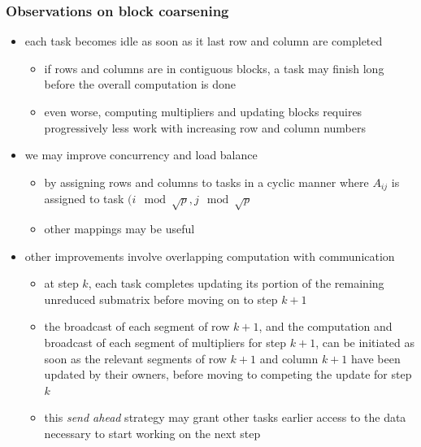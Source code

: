 \begin{frame}[fragile]
%
  \frametitle{Observations on block coarsening}
%
  \begin{itemize}
%
  \item each task becomes idle as soon as it last row and column are completed
    \begin{itemize}
    \item if rows and columns are in contiguous blocks, a task may finish long before the
      overall computation is done
    \item even worse, computing multipliers and updating blocks requires progressively less
      work with increasing row and column numbers
    \end{itemize}
%
  \item we may improve concurrency and load balance 
    \begin{itemize}
    \item by assigning rows and columns to tasks in a cyclic manner where $A_{ij}$ is assigned
      to task $(i \mod \sqrt{p}, j \mod \sqrt{p}$
    \item other mappings may be useful
    \end{itemize}
%
  \item other improvements involve overlapping computation with communication
    \begin{itemize}
    \item at step $k$, each task completes updating its portion of the remaining unreduced
      submatrix before moving on to step $k+1$
    \item the broadcast of each segment of row $k+1$, and the computation and broadcast of each
      segment of multipliers for step $k+1$, can be initiated as soon as the relevant segments
      of row $k+1$ and column $k+1$ have been updated by their owners, before moving to
      competing the update for step $k$
    \item this {\em send ahead} strategy may grant other tasks earlier access to the data
      necessary to start working on the next step
    \end{itemize}
%
  \end{itemize}
%
\end{frame}

